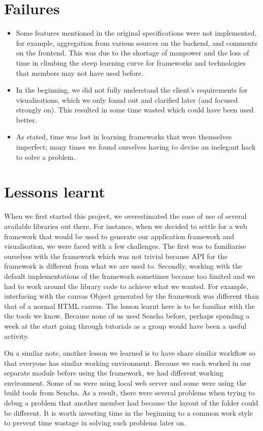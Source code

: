 \documentclass[12pt,a4paper,twoside]{article}
\begin{document}
\section{Failures}

\begin{itemize}
	\item Some features mentioned in the original specifications were not implemented, for example, aggregation from various sources on the backend, and comments on the frontend. This was due to the shortage of manpower and the loss of time in climbing the steep learning curve for frameworks and technologies that members may not have used before.
	\item In the beginning, we did not fully understand the client’s requirements for visualisations, which we only found out and clarified later (and focused strongly on). This resulted in some time wasted which could have been used better.
	\item As stated, time was lost in learning frameworks that were themselves imperfect; many times we found ourselves having to devise an inelegant hack to solve a problem.
\end{itemize}

\section{Lessons learnt}

When we first started this project, we overestimated the ease of use of several available libraries out there. For instance, when we decided to settle for a web framework that would be used to generate our application framework and visualisation, we were faced with a few challenges. The first was to familiarise ourselves with the framework which was not trivial because API for the framework is different from what we are used to. Secondly, working with the default implementations of the framework sometimes became too limited and we had to work around the library code to achieve what we wanted. For example, interfacing with the canvas Object generated by the framework was different than that of a normal HTML canvas. The lesson learnt here is to be familiar with the the tools we know. Because none of us used Sencha before, perhaps spending a week at the start going through tutorials as a group would have been a useful activity.

On a similar note, another lesson we learned is to have share similar workflow so that everyone has similar working environment. Because we each worked in our separate module before using the framework, we had different working environment. Some of us were using local web server and some were using the build tools from Sencha. As a result, there were several problems when trying to debug a problem that another member had because the layout of the folder could be different. It is worth investing time in the beginning to a common work style to prevent time wastage in solving such problems later on.
\end{document}
